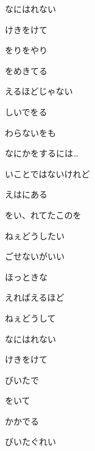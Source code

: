 \documentclass[a4paper,tate,twocolumn,12pt]{ltjtarticle}
\begin{document}
\begin{flushleft}
\begin{minipage}{\linewidth}
なにはれない

けきをけて
\end{minipage}

\vspace{2em}

\noindent\begin{minipage}{\linewidth}
をりをやり

をめきてる

えるほどじゃない

しいでをる

わらないをも

なにかをするには…

いことではないけれど

えはにある

をい、れてたこのを
\end{minipage}

\vspace{2em}

\noindent\begin{minipage}{\linewidth}
ねぇどうしたい

ごせないがいい

ほっときな

えればえるほど

ねぇどうして

なにはれない

けきをけて
\end{minipage}

\vspace{2em}

\noindent\begin{minipage}{\linewidth}
びいたで

をいて

かかでる

びいたぐれい


\end{minipage}
\end{flushleft}
\end{document}
